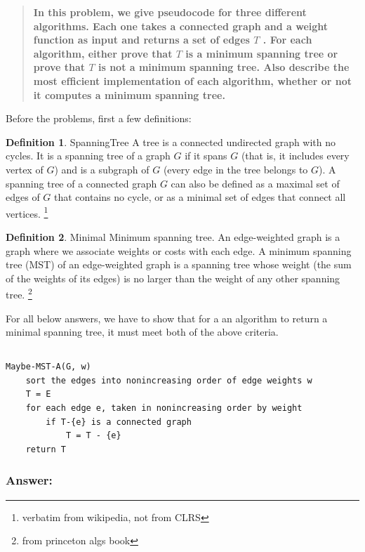 \documentclass[titlepage]{article}
\theoremstyle{definition}
\newtheorem{definition}{Definition}[section]
\begin{document}
\begin{quote}
  \textbf{ In this problem, we give pseudocode for three different algorithms.
	Each one takes a connected graph and a weight function as input and returns
	a set of edges $T$ .  For each algorithm, either prove that $T$ is a
	minimum spanning tree or prove that $T$ is not a minimum spanning tree.
	Also describe the most efﬁcient implementation of each algorithm, whether or
	not it computes a minimum spanning tree.  }
\end{quote}

Before the problems, first a few definitions:

\theoremstyle{definition}
\begin{definition}{SpanningTree}
  A tree is a connected undirected graph with no cycles. It is a spanning tree
  of a graph $G$ if it spans $G$ (that is, it includes every vertex of $G$) and is a
  subgraph of $G$ (every edge in the tree belongs to $G$). A spanning tree of a
  connected graph $G$ can also be defined as a maximal set of edges of $G$ that
  contains no cycle, or as a minimal set of edges that connect all vertices.
  \footnote{verbatim from wikipedia, not from CLRS}
\end{definition}
\begin{definition}{Minimal}
  Minimum spanning tree. An edge-weighted graph is a graph where we associate
  weights or costs with each edge. A minimum spanning tree (MST) of an
  edge-weighted graph is a spanning tree whose weight (the sum of the weights
  of its edges) is no larger than the weight of any other spanning tree.
  \footnote{from princeton algs book}
\end{definition}

For all below answers, we have to show that for a an algorithm to return a
minimal spanning tree, it must meet both of the above criteria.

\subsection{}
\begin{lstlisting}
Maybe-MST-A(G, w)
	sort the edges into nonincreasing order of edge weights w
	T = E
	for each edge e, taken in nonincreasing order by weight
		if T-{e} is a connected graph
			T = T - {e}
	return T
\end{lstlisting}
\subsubsection{Answer: }
\end{document}
